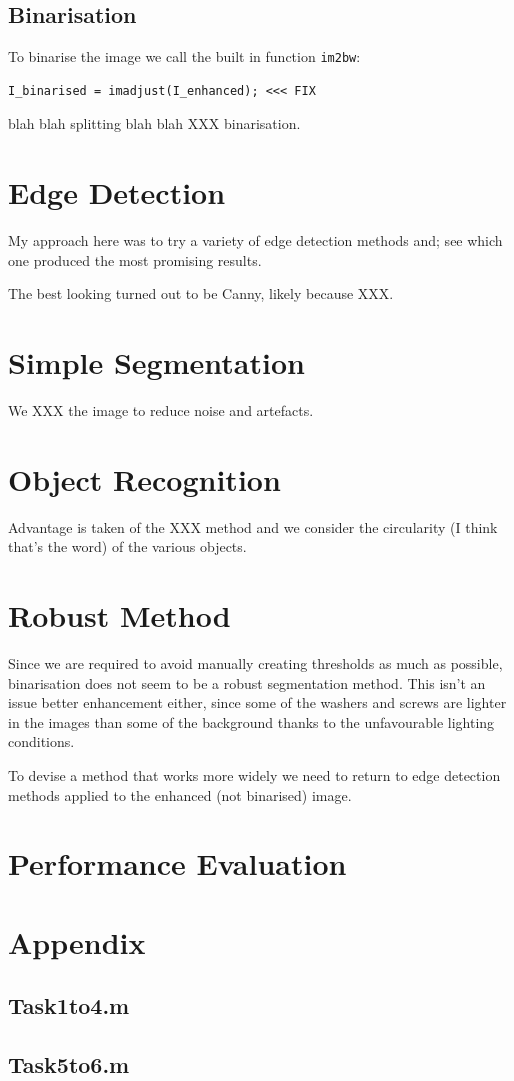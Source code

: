 \documentclass{article}
\begin{document}
\subsection{Binarisation}
To binarise the image we call the built in function
\texttt{im2bw}:

\begin{verbatim}
I_binarised = imadjust(I_enhanced); <<< FIX
\end{verbatim}

blah blah splitting blah blah XXX binarisation.

\section{Edge Detection}
My approach here was to try a variety of edge detection methods and;
see which one produced the most promising results.

The best looking turned out to be Canny, likely because XXX.

\section{Simple Segmentation}


We XXX the image to reduce noise and artefacts.

\section{Object Recognition}
Advantage is taken of the XXX method and we consider the circularity
(I think that's the word) of the various objects.
\section{Robust Method}
Since we are required to avoid manually creating thresholds as much
as possible, binarisation does not seem to be a robust segmentation
method. This isn't an issue better enhancement either, since some
of the washers and screws are lighter in the images than some of the
background thanks to the unfavourable lighting conditions.

To devise a method that works more widely we need to return to
edge detection methods applied to the enhanced (not binarised)
image.

\section{Performance Evaluation}
\section*{Appendix}
\subsection*{Task1to4.m}

\subsection*{Task5to6.m}

\end{document}
